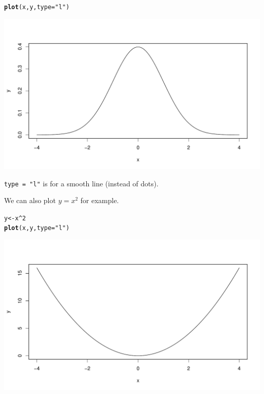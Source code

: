 \documentclass[oneside]{book}\usepackage[]{graphicx}\usepackage[dvipsnames,table,xcdraw]{xcolor}
\makeatletter
\def\maxwidth{ %
  \ifdim\Gin@nat@width>\linewidth
    \linewidth
  \else
    \Gin@nat@width
  \fi
}
\newcommand{\hlnum}[1]{\textcolor[rgb]{0.686,0.059,0.569}{#1}}%
\newcommand{\hlstr}[1]{\textcolor[rgb]{0.192,0.494,0.8}{#1}}%
\newcommand{\hlopt}[1]{\textcolor[rgb]{0,0,0}{#1}}%
\newcommand{\hlstd}[1]{\textcolor[rgb]{0.345,0.345,0.345}{#1}}%
\newcommand{\hlkwb}[1]{\textcolor[rgb]{0.69,0.353,0.396}{#1}}%
\newcommand{\hlkwc}[1]{\textcolor[rgb]{0.333,0.667,0.333}{#1}}%
\newcommand{\hlkwd}[1]{\textcolor[rgb]{0.737,0.353,0.396}{\textbf{#1}}}%
\newenvironment{kframe}{%
 \def\at@end@of@kframe{}%
 \ifinner\ifhmode%
  \def\at@end@of@kframe{\end{minipage}}%
  \begin{minipage}{\columnwidth}%
 \fi\fi%
 \def\FrameCommand##1{\hskip\@totalleftmargin \hskip-\fboxsep
 \colorbox{shadecolor}{##1}\hskip-\fboxsep
     \hskip-\linewidth \hskip-\@totalleftmargin \hskip\columnwidth}%
 \MakeFramed {\advance\hsize-\width
   \@totalleftmargin\z@ \linewidth\hsize
   \@setminipage}}%
 {\par\unskip\endMakeFramed%
 \at@end@of@kframe}
\newenvironment{knitrout}{}{} %
\newcommand{\code}[1]{\texttt{#1}}
\makeatother
\begin{document}
\begin{knitrout}
\color{fgcolor}\begin{kframe}
\begin{alltt}
\hlkwd{plot}\hlstd{(x, y,} \hlkwc{type} \hlstd{=} \hlstr{"l"}\hlstd{)}
\end{alltt}
\end{kframe}

{\centering \includegraphics[width=\maxwidth]{figure/unnamed-chunk-32-1} 

}


\end{knitrout}

\code{type = "l"} is for a smooth line (instead of dots).

We can also plot $y=x^2$ for example.
\begin{knitrout}
\color{fgcolor}\begin{kframe}
\begin{alltt}
\hlstd{y} \hlkwb{<-} \hlstd{x} \hlopt{^} \hlnum{2}
\hlkwd{plot}\hlstd{(x, y,} \hlkwc{type} \hlstd{=} \hlstr{"l"}\hlstd{)}
\end{alltt}
\end{kframe}

{\centering \includegraphics[width=\maxwidth]{figure/unnamed-chunk-33-1} 

}


\end{knitrout}
\end{document}
